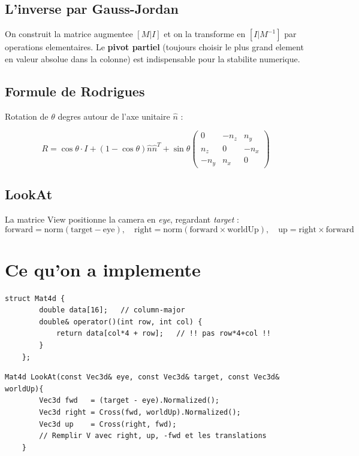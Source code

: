 \documentclass[12pt,a4paper]{report}
\begin{document}
\subsection*{L'inverse par Gauss-Jordan}

On construit la matrice augmentee $[M|I]$ et on la transforme en $[I|M^{-1}]$ par operations elementaires. Le \textbf{pivot partiel} (toujours choisir le plus grand element en valeur absolue dans la colonne) est indispensable pour la stabilite numerique.

\subsection*{Formule de Rodrigues}

Rotation de $\theta$ degres autour de l'axe unitaire $\hat{n}$ :

\[
R = \cos\theta \cdot I + (1-\cos\theta)\hat{n}\hat{n}^T
    + \sin\theta \begin{pmatrix}0&-n_z&n_y\\n_z&0&-n_x\\-n_y&n_x&0\end{pmatrix}
\]

\subsection*{LookAt}

La matrice View positionne la camera en \textit{eye}, regardant \textit{target} :
\[
\text{forward} = \text{norm}(\text{target}-\text{eye}), \quad
\text{right} = \text{norm}(\text{forward}\times\text{worldUp}), \quad
\text{up} = \text{right}\times\text{forward}
\]

\section{Ce qu'on a implemente}

\begin{lstlisting}[caption={Mat4d : acces column-major}]
    struct Mat4d {
        double data[16];   // column-major
        double& operator()(int row, int col) {
            return data[col*4 + row];   // !! pas row*4+col !!
        }
    };
\end{lstlisting}

\begin{lstlisting}[caption={LookAt : construction du repere camera}]
    Mat4d LookAt(const Vec3d& eye, const Vec3d& target, const Vec3d& worldUp){
        Vec3d fwd   = (target - eye).Normalized();
        Vec3d right = Cross(fwd, worldUp).Normalized();
        Vec3d up    = Cross(right, fwd);
        // Remplir V avec right, up, -fwd et les translations
    }
\end{lstlisting}
\end{document}
